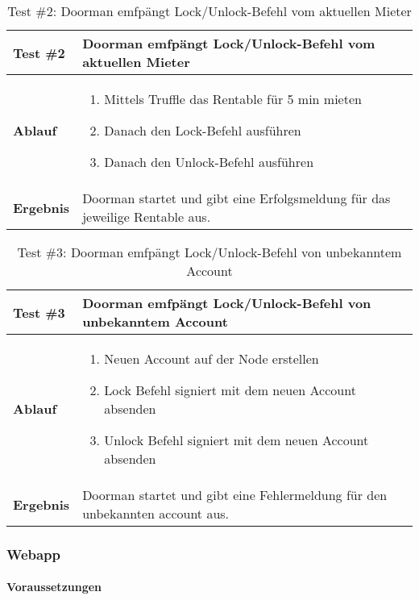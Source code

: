 \begin{table}[H]
\centering
\caption{Test \#2: Doorman emfpängt Lock/Unlock-Befehl vom aktuellen Mieter}
\label{my-label}
\begin{tabular}{@{}L{1.6cm}L{11cm}@{}}
\toprule
\textbf{Test \#2}
& Doorman emfpängt Lock/Unlock-Befehl vom aktuellen Mieter
\\ \midrule
\textbf{Ablauf}
& 
\begin{enumerate}
    \item Mittels Truffle das Rentable für 5 min mieten
    \item Danach den Lock-Befehl ausführen
    \item Danach den Unlock-Befehl ausführen
\end{enumerate}
\\ \midrule
\textbf{Ergebnis}
& Doorman startet und gibt eine Erfolgsmeldung für das jeweilige Rentable aus.

\\ \bottomrule
\end{tabular}
\end{table}

\begin{table}[H]
\centering
\caption{Test \#3: Doorman emfpängt Lock/Unlock-Befehl von unbekanntem Account}
\label{my-label}
\begin{tabular}{@{}L{1.6cm}L{11cm}@{}}
\toprule
\textbf{Test \#3}
& Doorman emfpängt Lock/Unlock-Befehl von unbekanntem Account
\\ \midrule
\textbf{Ablauf}
& 
\begin{enumerate}
    \item Neuen Account auf der Node erstellen
    \item Lock Befehl signiert mit dem neuen Account absenden
    \item Unlock Befehl signiert mit dem neuen Account absenden
\end{enumerate}
\\ \midrule
\textbf{Ergebnis}
& Doorman startet und gibt eine Fehlermeldung für den unbekannten account aus.

\\ \bottomrule
\end{tabular}
\end{table}

\subsubsection{Webapp}

\paragraph{Voraussetzungen}

